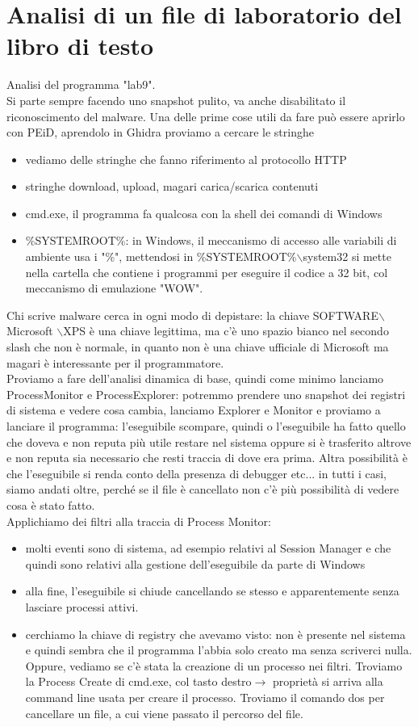 \documentclass[12pt, oneside]{extbook}
\begin{document}
\section{Analisi di un file di laboratorio del libro di testo}
Analisi del programma "lab9".\\Si parte sempre facendo uno snapshot pulito, va anche disabilitato il riconoscimento del malware. Una delle prime cose utili da fare può essere aprirlo con PEiD, aprendolo in Ghidra proviamo a cercare le stringhe
\begin{itemize}
\item vediamo delle stringhe che fanno riferimento al protocollo HTTP
\item stringhe download, upload, magari carica/scarica contenuti
\item cmd.exe, il programma fa qualcosa con la shell dei comandi di Windows
\item \%SYSTEMROOT\%: in Windows, il meccanismo di accesso alle variabili di ambiente usa i "\%", mettendosi in \%SYSTEMROOT\%$\backslash$system32 si mette nella cartella che contiene i programmi per eseguire il codice a 32 bit, col meccanismo di emulazione "WOW".
\end{itemize}
Chi scrive malware cerca in ogni modo di depistare: la chiave SOFTWARE$\backslash$Microsoft $\backslash$XPS è una chiave legittima, ma c'è uno spazio bianco nel secondo slash che non è normale, in quanto non è una chiave ufficiale di Microsoft ma magari è interessante per il programmatore.\\ Proviamo a fare dell'analisi dinamica di base, quindi come minimo lanciamo ProcessMonitor e ProcessExplorer: potremmo prendere uno snapshot dei registri di sistema e vedere cosa cambia, lanciamo Explorer e Monitor e proviamo a lanciare il programma: l'eseguibile scompare, quindi o l'eseguibile ha fatto quello che doveva e non reputa più utile restare nel sistema oppure si è trasferito altrove e non reputa sia necessario che resti traccia di dove era prima. Altra possibilità è che l'eseguibile si renda conto della presenza di debugger etc... in tutti i casi, siamo andati oltre, perché se il file è cancellato non c'è più possibilità di vedere cosa è stato fatto.\\Applichiamo dei filtri alla traccia di Process Monitor:
\begin{itemize}
\item molti eventi sono di sistema, ad esempio relativi al Session Manager e che quindi sono relativi alla gestione dell'eseguibile da parte di Windows
\item alla fine, l'eseguibile si chiude cancellando se stesso e apparentemente senza lasciare processi attivi.
\item cerchiamo la chiave di registry che avevamo visto: non è presente nel sistema e quindi sembra che il programma l'abbia solo creato ma senza scriverci nulla. Oppure, vediamo se c'è stata la creazione di un processo nei filtri. Troviamo la Process Create di cmd.exe, col tasto destro$\rightarrow$ proprietà si arriva alla command line usata per creare il processo. Troviamo il comando dos per cancellare un file, a cui viene passato il percorso del file.
\end{itemize}
\end{document}
